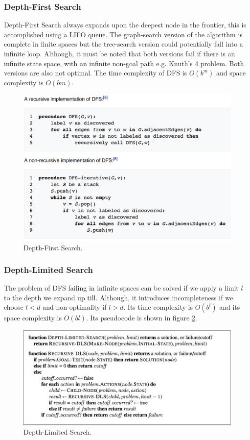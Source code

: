 \documentclass[twoside]{article}
\begin{document}
\subsubsection{Depth-First Search}
Depth-First Search always expands upon the deepest node in the frontier, this
is accomplished using a LIFO queue. The graph-search version of the algorithm
is complete in finite spaces but the tree-search version could potentially
fall into a infinite loop. Although, it must be noted that both versions fail
if there is an infinite state space, with an infinite non-goal path e.g.
Knuth's 4 problem. Both versions are also not optimal. The time complexity of
DFS is \(O(b^m)\) and space complexity is \(O(bm)\).
\begin{figure}
  \includegraphics[width=\linewidth]{dfs.png}
  \caption{Depth-First Search.}
  \label{fig:dfs}
\end{figure}
\subsubsection{Depth-Limited Search}
The problem of DFS failing in infinite spaces can be solved if we apply a
limit \(l\) to the depth we expand up till. Although, it introduces 
incompleteness if we choose \(l < d\) and non-optimality if \(l > d \). Its 
time complexity is \(O(b^l)\) and its space complexity is \(O(bl)\). Its 
pseudocode is shown in figure \ref{fig:dls}.
\begin{figure}
  \includegraphics[width=\linewidth]{dls.png}
  \caption{Depth-Limited Search.}
  \label{fig:dls}
\end{figure}
\end{document}
